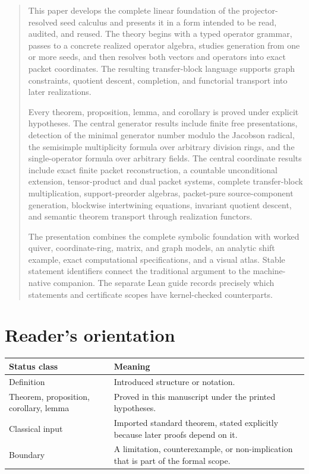 \documentclass[11pt]{article}
\theoremstyle{definition}
\theoremstyle{remark}
\theoremstyle{definition}\newtheorem{example}[theorem]{Example}
\begin{document}
\KomorebiCover
\begin{abstract}
This paper develops the complete linear foundation of the projector-resolved seed calculus and presents it in a form intended to be read, audited, and reused.  The theory begins with a typed operator grammar, passes to a concrete realized operator algebra, studies generation from one or more seeds, and then resolves both vectors and operators into exact packet coordinates.  The resulting transfer-block language supports graph constraints, quotient descent, completion, and functorial transport into later realizations.

Every theorem, proposition, lemma, and corollary is proved under explicit hypotheses.  The central generator results include finite free presentations, detection of the minimal generator number modulo the Jacobson radical, the semisimple multiplicity formula over arbitrary division rings, and the single-operator formula over arbitrary fields.  The central coordinate results include exact finite packet reconstruction, a countable unconditional extension, tensor-product and dual packet systems, complete transfer-block multiplication, support-preorder algebras, packet-pure source-component generation, blockwise intertwining equations, invariant quotient descent, and semantic theorem transport through realization functors.

The presentation combines the complete symbolic foundation with worked quiver, coordinate-ring, matrix, and graph models, an analytic shift example, exact computational specifications, and a visual atlas. Stable statement identifiers connect the traditional argument to the machine-native companion. The separate Lean guide records precisely which statements and certificate scopes have kernel-checked counterparts.
\end{abstract}

\clearpage
\begingroup\small{}\tableofcontents\endgroup
\clearpage

\section*{Reader's orientation}
\begin{center}
\begin{tabularx}{0.96\textwidth}{@{}lY@{}}
\toprule
\textbf{Status class} & \textbf{Meaning}\\
\midrule
Definition & Introduced structure or notation.\\
Theorem, proposition, corollary, lemma & Proved in this manuscript under the printed hypotheses.\\
Classical input & Imported standard theorem, stated explicitly because later proofs depend on it.\\
Boundary & A limitation, counterexample, or non-implication that is part of the formal scope.\\
\bottomrule
\end{tabularx}
\end{center}
\end{document}
